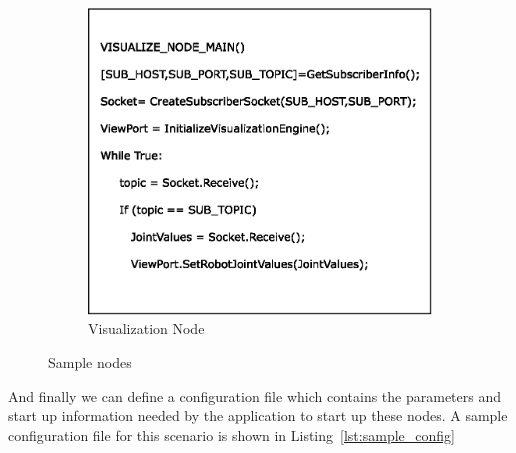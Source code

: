 \begin{figure}[H]
\begin{subfigure}[t]{0.48\textwidth}
\includegraphics[width=\textwidth]{assets/sample_node_B.eps}
\caption[Visualization Node]{Visualization Node}
\label{fig:node_b}
\end{subfigure}
\caption[Sample nodes]{Sample nodes}
\label{fig:pseudo_nodes}
\end{figure}
And finally we can define a configuration file which contains the parameters and start up information needed by the application to start up these nodes. A sample configuration file for this scenario is shown in Listing~\ref{lst:sample_config}


